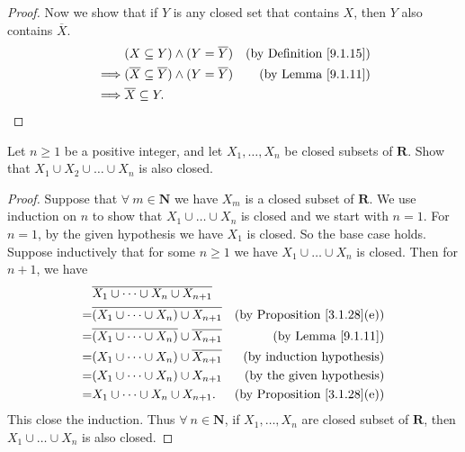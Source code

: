 \begin{proof}
    Now we show that if \(Y\) is any closed set that contains \(X\), then \(Y\) also contains \(\overline{X}\).
    \begin{align*}
                 & (X \subseteq Y) \land (Y = \overline{Y})                       & \text{(by Definition \ref{9.1.15})} \\
        \implies & (\overline{X} \subseteq \overline{Y}) \land (Y = \overline{Y}) & \text{(by Lemma \ref{9.1.11})}      \\
        \implies & \overline{X} \subseteq Y.
    \end{align*}
\end{proof}

\begin{exercise}\label{ex 9.1.7}
    Let \(n \geq 1\) be a positive integer, and let \(X_1, \dots, X_n\) be closed subsets of \(\mathbf{R}\).
    Show that \(X_1 \cup X_2 \cup \dots \cup X_n\) is also closed.
\end{exercise}

\begin{proof}
    Suppose that \(\forall\ m \in \mathbf{N}\) we have \(X_m\) is a closed subset of \(\mathbf{R}\).
    We use induction on \(n\) to show that \(X_1 \cup \dots \cup X_n\) is closed and we start with \(n = 1\).
    For \(n = 1\), by the given hypothesis we have \(X_1\) is closed.
    So the base case holds.
    Suppose inductively that for some \(n \geq 1\) we have \(X_1 \cup \dots \cup X_n\) is closed.
    Then for \(n + 1\), we have
    \begin{align*}
          & \overline{X_1 \cup \dots \cup X_n \cup X_{n + 1}}                                                        \\
        = & \overline{(X_1 \cup \dots \cup X_n) \cup X_{n + 1}}            & \text{(by Proposition \ref{3.1.28}(e))} \\
        = & \overline{(X_1 \cup \dots \cup X_n)} \cup \overline{X_{n + 1}} & \text{(by Lemma \ref{9.1.11})}          \\
        = & (X_1 \cup \dots \cup X_n) \cup \overline{X_{n + 1}}            & \text{(by induction hypothesis)}        \\
        = & (X_1 \cup \dots \cup X_n) \cup X_{n + 1}                       & \text{(by the given hypothesis)}        \\
        = & X_1 \cup \dots \cup X_n \cup X_{n + 1}.                        & \text{(by Proposition \ref{3.1.28}(e))}
    \end{align*}
    This close the induction.
    Thus \(\forall\ n \in \mathbf{N}\), if \(X_1, \dots, X_n\) are closed subset of \(\mathbf{R}\), then \(X_1 \cup \dots \cup X_n\) is also closed.
\end{proof}

